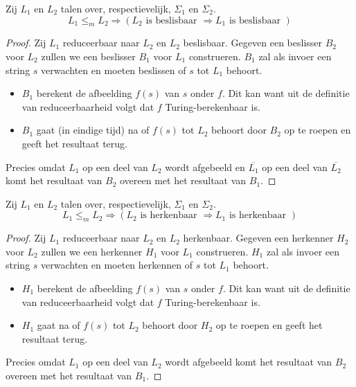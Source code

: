 \documentclass[main.tex]{subfiles}
\begin{document}
\begin{st}
  Zij $L_1$ en $L_2$ talen over, respectievelijk, $\Sigma_1$ en $\Sigma_2$.
  \[ L_1\le_m L_2 \Rightarrow (L_2 \text{ is beslisbaar } \Rightarrow L_1 \text{ is beslisbaar }) \]

  \begin{proof}
    Zij $L_{1}$ reduceerbaar naar $L_{2}$ en $L_{2}$ beslisbaar.
    Gegeven een beslisser $B_{2}$ voor $L_{2}$ zullen we een beslisser $B_{1}$ voor $L_{1}$ construeren.
    $B_{1}$ zal als invoer een string $s$ verwachten en moeten beslissen of $s$ tot $L_{1}$ behoort.
    \begin{itemize}
    \item $B_{1}$ berekent de afbeelding $f(s)$ van $s$ onder $f$.
      Dit kan want uit de definitie van reduceerbaarheid volgt dat $f$ Turing-berekenbaar is.
    \item $B_{1}$ gaat (in eindige tijd) na of $f(s)$ tot $L_{2}$ behoort door $B_{2}$ op te roepen en geeft het resultaat terug.
    \end{itemize}
    Precies omdat $L_{1}$ op een deel van $L_{2}$ wordt afgebeeld en $\overline{L_{1}}$ op een deel van $\overline{L_{2}}$ komt het resultaat van $B_{2}$ overeen met het resultaat van $B_{1}$.
  \end{proof}
\end{st}


\begin{st}
  Zij $L_1$ en $L_2$ talen over, respectievelijk, $\Sigma_1$ en $\Sigma_2$.
  \[ L_1\le_m L_2 \Rightarrow (L_2 \text{ is herkenbaar } \Rightarrow L_1 \text{ is herkenbaar }) \]

  \begin{proof}
    Zij $L_{1}$ reduceerbaar naar $L_{2}$ en $L_{2}$ herkenbaar.
    Gegeven een herkenner $H_{2}$ voor $L_{2}$ zullen we een herkenner $H_{1}$ voor $L_{1}$ construeren.
    $H_{1}$ zal als invoer een string $s$ verwachten en moeten herkennen of $s$ tot $L_{1}$ behoort.
    \begin{itemize}
    \item $H_{1}$ berekent de afbeelding $f(s)$ van $s$ onder $f$.
      Dit kan want uit de definitie van reduceerbaarheid volgt dat $f$ Turing-berekenbaar is.
    \item $H_{1}$ gaat na of $f(s)$ tot $L_{2}$ behoort door $H_{2}$ op te roepen en geeft het resultaat terug.
    \end{itemize}
    Precies omdat $L_{1}$ op een deel van $L_{2}$ wordt afgebeeld komt het resultaat van $B_{2}$ overeen met het resultaat van $B_{1}$.
  \end{proof}
\end{st}
\end{document}
